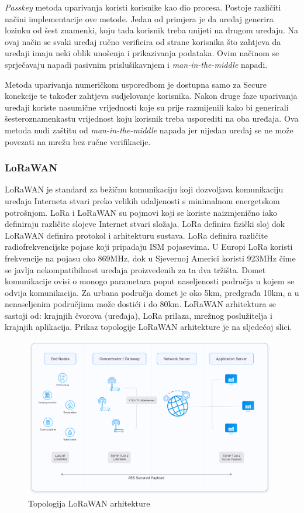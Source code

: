 \documentclass[times, utf8, diplomski]{fer}
\begin{document}
\emph{Passkey} metoda uparivanja koristi korisnike kao dio procesa. Postoje različiti načini implementacije ove metode. Jedan od primjera je da uređaj generira lozinku od šest znamenki, koju tada korisnik treba unijeti na drugom uređaju. Na ovaj način se svaki uređaj ručno verificira od strane korisnika što zahtjeva da uređaji imaju neki oblik unošenja i prikazivanja podataka. Ovim načinom se sprječavaju napadi pasivnim prislušikavnjem i \emph{man-in-the-middle} napadi.

Metoda uparivanja numeričkom usporedbom je dostupna samo za Secure konekcije te također zahtjeva sudjelovanje korisnika. Nakon druge faze uparivanja uređaji koriste nasumične vrijednosti koje su prije razmijenili kako bi generirali šesteroznamenkastu vrijednost koju korisnik treba usporediti na oba uređaja. Ova metoda nudi zaštitu od \emph{man-in-the-middle} napada jer nijedan uređaj se ne može povezati na mrežu bez ručne verifikacije\citep{Kacherovska2019Aug}.


\subsubsection{LoRaWAN}
LoRaWAN \citep{Lora} je standard za bežičnu komunikaciju koji dozvoljava komunikaciju uređaja Interneta stvari preko velikih udaljenosti s minimalnom energetskom potrošnjom. LoRa i LoRaWAN su pojmovi koji se koriste naizmjenično iako definiraju različite slojeve Internet stvari složaja. LoRa definira fizički sloj dok LoRaWAN definira protokol i arhitekturu sustava. LoRa definira različite radiofrekvencijske pojase koji pripadaju ISM pojasevima. U Europi LoRa koristi frekvencije na pojasu oko 869MHz, dok u Sjevernoj Americi koristi 923MHz čime se javlja nekompatibilnost uređaja proizvedenih za ta dva tržišta. Domet komunikacije ovisi o monogo parametara poput naseljenosti područja u kojem se odvija komunikacija. Za urbana područja domet je oko 5km, predgrađa 10km, a u nenaseljenim područjima može dostići i do 80km.
LoRaWAN arhitektura se sastoji od: krajnjih čvorova (uređaja), LoRa prilaza, mrežnog poslužitelja i krajnjih aplikacija. Prikaz topologije LoRaWAN arhitekture je na sljedećoj slici.
\begin{figure}[H]
    \centering
    \includegraphics[width=11cm]{images/lorawan.png}
    \caption{Topologija LoRaWAN arhitekture\citep{LoraWANImg}}
    \label{fig:lorawan}
\end{figure}
\end{document}
